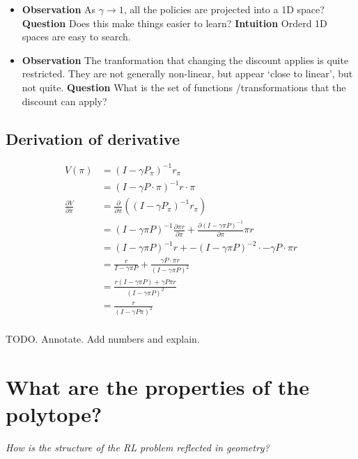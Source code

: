 \begin{itemize}
\item
  \textbf{Observation} As \(\gamma \to 1\), all the policies are
  projected into a 1D space? \textbf{Question} Does this make things
  easier to learn? \textbf{Intuition} Orderd 1D spaces are easy to
  search.
\item
  \textbf{Observation} The tranformation that changing the discount
  applies is quite restricted. They are not generally non-linear, but
  appear `close to linear', but not quite. \textbf{Question} What is the
  set of functions /transformations that the discount can apply?
\end{itemize}

\subsection{Derivation of derivative}

\begin{align}
V(\pi) &= (I − \gamma P_{\pi})^{−1}r_{\pi} \\
&= (I − \gamma P\cdot \pi)^{−1}r\cdot \pi \\
\frac{\partial V}{\partial \pi} &= \frac{\partial}{\partial \pi}((I-\gamma P_{\pi})^{-1} r_{\pi}) \\
&= (I-\gamma \pi P)^{-1} \frac{\partial \pi r}{\partial \pi}+   \frac{\partial (I-\gamma \pi P)^{-1}}{\partial \pi}\pi r\tag{product rule} \\
&= (I-\gamma \pi P)^{-1} r + -(I-\gamma \pi P)^{-2} \cdot -\gamma P\cdot \pi r\\
&= \frac{r}{I-\gamma \pi P} + \frac{ \gamma P\cdot \pi r}{(I-\gamma \pi P)^2}\\
&= \frac{r(I-\gamma \pi P) + \gamma P \pi r}{(I-\gamma \pi P)^2} \\
& = \frac{r}{(I-\gamma P \pi)^2} \\
\end{align}

TODO. Annotate. Add numbers and explain.



\section{What are the properties of the polytope?}

\begin{displayquote}
  \textit{How is the structure of the RL problem reflected in geometry?}
\end{displayquote}

